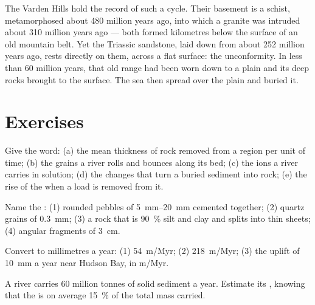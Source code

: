 The Varden Hills hold the record of such a cycle. Their basement is a schist,
metamorphosed about 480 million years ago, into which a granite was intruded
about 310 million years ago --- both formed kilometres below the surface of
an old mountain belt. Yet the Triassic sandstone, laid down from about 252
million years ago, rests directly on them, across a flat surface: the
unconformity. In less than 60 million years, that old range had been worn
down to a plain and its deep rocks brought to the surface. The sea then
spread over the plain and buried it.

\section{Exercises}

\begin{exercise}[$\star$]\label{exo:g12:destruction-of-mountains:1}
Give the word: (a) the mean thickness of rock removed from a region per unit
of time; (b) the grains a river rolls and bounces along its bed; (c) the
ions a river carries in solution; (d) the changes that turn a buried sediment
into rock; (e) the rise of the  when a load is removed from it.
\end{exercise}

\begin{exercise}[$\star$]\label{exo:g12:destruction-of-mountains:2}
Name the : (1) rounded pebbles of \qtyrange{5}{20}{mm}
cemented together; (2) quartz grains of \qty{0.3}{mm}; (3) a rock that is
\qty{90}{\percent} silt and clay and splits into thin sheets; (4) angular
fragments of \qty{3}{cm}.
\end{exercise}

\begin{exercise}[$\star$]\label{exo:g12:destruction-of-mountains:3}
Convert to millimetres a year: (1) \qty{54}{m/Myr}; (2) \qty{218}{m/Myr};
(3) the uplift of \qty{10}{mm} a year near Hudson Bay, in \unit{m/Myr}.
\end{exercise}

\begin{exercise}[$\star$]\label{exo:g12:destruction-of-mountains:4}
A river carries 60 million tonnes of solid sediment a year. Estimate its
, knowing that the  is on average
\qty{15}{\percent} of the total mass carried.
\end{exercise}

